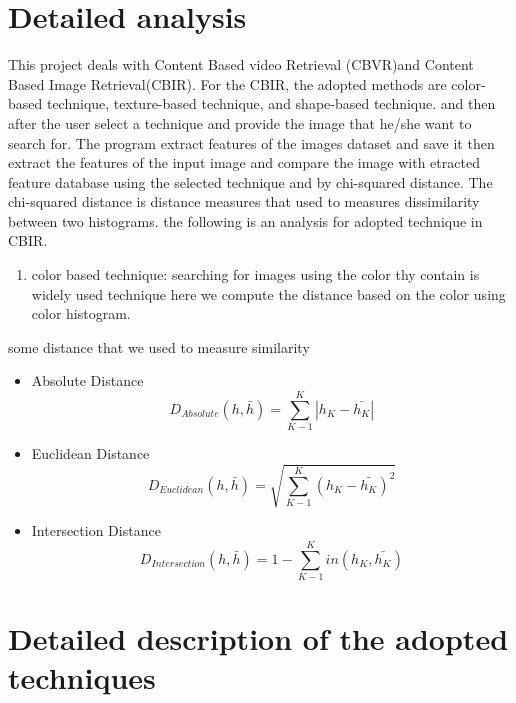 \documentclass[pdftex,10pt,a4paper,oneside]{article}
\begin{document}
	
	\pagebreak
	\section{Detailed analysis}
	This project deals with Content Based video Retrieval (CBVR)and Content Based Image Retrieval(CBIR). 
	For the CBIR, the adopted methods are color-based technique, texture-based technique, and shape-based technique. and then after the user select a technique and provide the image that he/she want to search for. The program extract features of the images dataset and save it then extract the features of the input image and compare the image with etracted feature database using the selected technique and by chi-squared distance. The chi-squared distance is distance measures that used to measures dissimilarity between two histograms. the following is an analysis for adopted technique in CBIR.
	\begin{enumerate}
		\item color based technique: searching for images using the color thy contain is widely used technique here we compute the distance based on the color using color histogram.
	

	
	\end{enumerate}
some distance that we used to measure similarity 
\begin{itemize}
	\item Absolute Distance \\
	\begin{equation}
		D_{Absolute}(h,\bar{h})= \sum_{K-1}^{K} |h_{K}-\bar{h_{K}}|
	\end{equation}
	\item Euclidean Distance \\
	\begin{equation}
		D_{Euclidean}(h,\bar{h})= \sqrt{\sum_{K-1}^{K} (h_{K}-\bar{h_{K}})^{2}}
	\end{equation}
	\item Intersection Distance \\
	\begin{equation}
	D_{Intersection}(h,\bar{h})= 1- \sum_{K-1}^{K} in(h_{K},\bar{h_{K}})
	\end{equation}
	
	
	
\end{itemize}


	
	\pagebreak
	\section{Detailed description of the adopted techniques }
\end{document}
